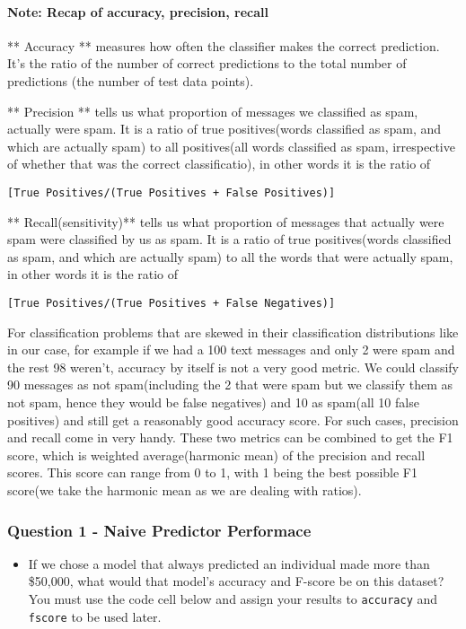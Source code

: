 \documentclass[11pt]{article}
\providecommand{\tightlist}{%
      \setlength{\itemsep}{0pt}\setlength{\parskip}{0pt}}
\begin{document}
\paragraph{Note: Recap of accuracy, precision,
recall}\label{note-recap-of-accuracy-precision-recall}

** Accuracy ** measures how often the classifier makes the correct
prediction. It's the ratio of the number of correct predictions to the
total number of predictions (the number of test data points).

** Precision ** tells us what proportion of messages we classified as
spam, actually were spam. It is a ratio of true positives(words
classified as spam, and which are actually spam) to all positives(all
words classified as spam, irrespective of whether that was the correct
classificatio), in other words it is the ratio of

\texttt{{[}True\ Positives/(True\ Positives\ +\ False\ Positives){]}}

** Recall(sensitivity)** tells us what proportion of messages that
actually were spam were classified by us as spam. It is a ratio of true
positives(words classified as spam, and which are actually spam) to all
the words that were actually spam, in other words it is the ratio of

\texttt{{[}True\ Positives/(True\ Positives\ +\ False\ Negatives){]}}

For classification problems that are skewed in their classification
distributions like in our case, for example if we had a 100 text
messages and only 2 were spam and the rest 98 weren't, accuracy by
itself is not a very good metric. We could classify 90 messages as not
spam(including the 2 that were spam but we classify them as not spam,
hence they would be false negatives) and 10 as spam(all 10 false
positives) and still get a reasonably good accuracy score. For such
cases, precision and recall come in very handy. These two metrics can be
combined to get the F1 score, which is weighted average(harmonic mean)
of the precision and recall scores. This score can range from 0 to 1,
with 1 being the best possible F1 score(we take the harmonic mean as we
are dealing with ratios).

    \subsubsection{Question 1 - Naive Predictor
Performace}\label{question-1---naive-predictor-performace}

\begin{itemize}
\tightlist
\item
  If we chose a model that always predicted an individual made more than
  \$50,000, what would that model's accuracy and F-score be on this
  dataset? You must use the code cell below and assign your results to
  \texttt{\textquotesingle{}accuracy\textquotesingle{}} and
  \texttt{\textquotesingle{}fscore\textquotesingle{}} to be used later.
\end{itemize}
\end{document}
